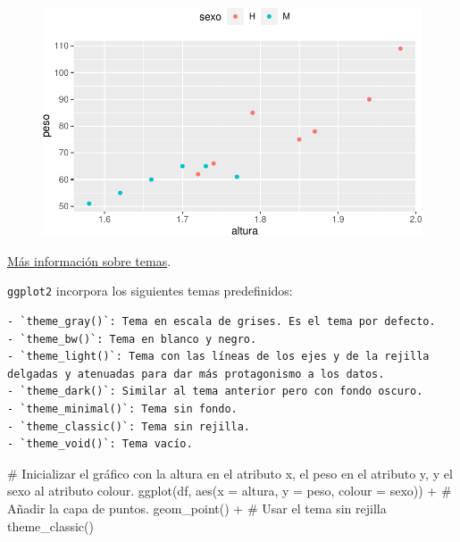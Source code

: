 \documentclass[
  a4paper,
]{scrreport}
\newenvironment{Shaded}{\begin{snugshade}}{\end{snugshade}}
\newcommand{\AttributeTok}[1]{\textcolor[rgb]{0.40,0.45,0.13}{#1}}
\newcommand{\CommentTok}[1]{\textcolor[rgb]{0.37,0.37,0.37}{#1}}
\newcommand{\FunctionTok}[1]{\textcolor[rgb]{0.28,0.35,0.67}{#1}}
\newcommand{\NormalTok}[1]{\textcolor[rgb]{0.00,0.23,0.31}{#1}}
\newcommand{\SpecialCharTok}[1]{\textcolor[rgb]{0.37,0.37,0.37}{#1}}
\theoremstyle{definition}
\theoremstyle{definition}
\theoremstyle{remark}
\begin{document}
\begin{figure}[H]

{\centering \includegraphics{07-graficos_files/figure-pdf/unnamed-chunk-31-1.pdf}

}

\end{figure}

\href{https://ggplot2.tidyverse.org/reference/theme.html}{Más
información sobre temas}.

\texttt{ggplot2} incorpora los siguientes temas predefinidos:

\begin{verbatim}
- `theme_gray()`: Tema en escala de grises. Es el tema por defecto.
- `theme_bw()`: Tema en blanco y negro.
- `theme_light()`: Tema con las líneas de los ejes y de la rejilla delgadas y atenuadas para dar más protagonismo a los datos.
- `theme_dark()`: Similar al tema anterior pero con fondo oscuro.
- `theme_minimal()`: Tema sin fondo.
- `theme_classic()`: Tema sin rejilla.
- `theme_void()`: Tema vacío.
\end{verbatim}

\begin{Shaded}
\begin{Highlighting}[]
\CommentTok{\# Inicializar el gráfico con la altura en el atributo x, el peso en el atributo y, y el sexo al atributo colour.}
\FunctionTok{ggplot}\NormalTok{(df, }\FunctionTok{aes}\NormalTok{(}\AttributeTok{x =}\NormalTok{ altura, }\AttributeTok{y =}\NormalTok{ peso, }\AttributeTok{colour =}\NormalTok{ sexo)) }\SpecialCharTok{+}
\CommentTok{\# Añadir la capa de puntos.}
    \FunctionTok{geom\_point}\NormalTok{() }\SpecialCharTok{+}
\CommentTok{\# Usar el tema sin rejilla}
    \FunctionTok{theme\_classic}\NormalTok{()}
\end{Highlighting}
\end{Shaded}
\end{document}
